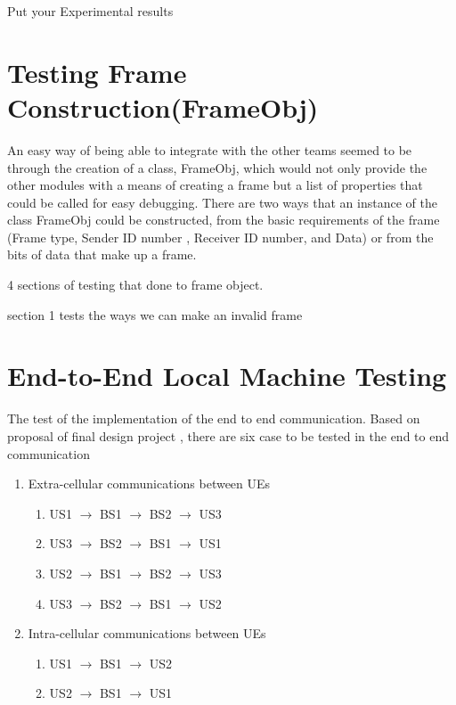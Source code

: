 
Put your Experimental results
\section{Testing Frame Construction(FrameObj)}
An easy way of being able to integrate with the other teams seemed to be through the creation of a class, FrameObj, which would not only provide the other modules with a means of creating a frame but a list of properties that could be called for easy debugging. There are two ways that an instance of the class FrameObj could be constructed,  from the basic requirements of the frame (Frame type, Sender ID number , Receiver ID number, and Data) or from the bits of data that make up a frame.

4 sections of testing that done to frame object. 

section 1 tests the ways we can make an invalid frame








\section{End-to-End Local Machine Testing }
The test of the implementation of the end to end communication.
Based on proposal of final design project \cite{cdproj}, there
are six case to be tested in the end to end communication
\begin{enumerate}
  \item Extra-cellular communications between UEs
  \begin{enumerate}
    \item US1 $\rightarrow$ BS1 $\rightarrow$ BS2 $\rightarrow$ US3
    \item US3 $\rightarrow$ BS2 $\rightarrow$ BS1 $\rightarrow$ US1
		\item US2 $\rightarrow$ BS1 $\rightarrow$ BS2 $\rightarrow$ US3
		\item US3 $\rightarrow$ BS2 $\rightarrow$ BS1 $\rightarrow$ US2
  \end{enumerate}
  \item Intra-cellular communications between UEs
	  \begin{enumerate}
    \item US1 $\rightarrow$ BS1 $\rightarrow$ US2
    \item US2 $\rightarrow$ BS1 $\rightarrow$ US1
	\end{enumerate}
\end{enumerate}

